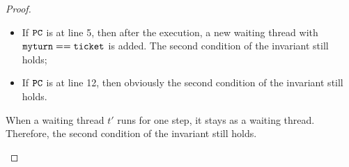 \documentclass{article}[10pt]
\newcommand{\kwd}[1]{\ensuremath{\text{\ttfamily #1}}\xspace}
\def\kmyturn{\kwd{myturn}}
\def\kticket{\kwd{ticket}}
\begin{document}
\begin{proof}
\begin{itemize}
\begin{itemize}
    \item If \kwd{PC} is at line 5, then after the execution, a new
      waiting thread with $\kmyturn == \kticket$ is added. The second
      condition of the invariant still holds;

    \item If \kwd{PC} is at line 12, then obviously the second
      condition of the invariant still holds.

    \end{itemize}
    When a waiting thread $t'$ runs for one step, it stays as a
    waiting thread. Therefore, the second condition of the invariant
    still holds.
    
  \end{itemize}


\end{proof}
\end{document}
